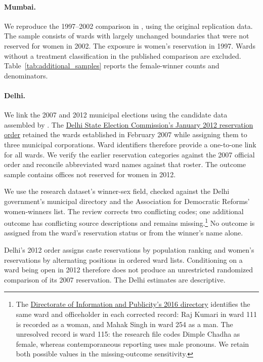 \paragraph{Mumbai.} We reproduce the 1997--2002 comparison in \citet{bhavnani2009electoral}, using the original replication data. The sample consists of \appMumbaiN{} wards with largely unchanged boundaries that were not reserved for women in 2002. The exposure is women's reservation in 1997. Wards without a treatment classification in the published comparison are excluded. Table~\ref{tab:additional_samples} reports the female-winner counts and denominators.

\paragraph{Delhi.} We link the 2007 and 2012 municipal elections using the candidate data assembled by \citet{goyal2025local}. The \href{https://sec.delhi.gov.in/sites/default/files/SEC/circulars-orders/notification-regarding-reservation-seats-2012_1.pdf}{Delhi State Election Commission's January 2012 reservation order} retained the wards established in February 2007 while assigning them to three municipal corporations. Ward identifiers therefore provide a one-to-one link for all \appDelhiLinked{} wards. We verify the earlier reservation categories against the 2007 official order and reconcile abbreviated ward names against that roster. The outcome sample contains \appDelhiOpen{} offices not reserved for women in 2012.

We use the research dataset's winner-sex field, checked against the Delhi government's municipal directory and the Association for Democratic Reforms' women-winners list. The review corrects two conflicting codes; one additional outcome has conflicting source descriptions and remains missing.\footnote{The \href{https://delhishelterboard.in/main/wp-content/uploads/2019/06/Online-Directory-2016-Delhi-Govt.pdf}{Directorate of Information and Publicity's 2016 directory} identifies the same ward and officeholder in each corrected record: Raj Kumari in ward 111 is recorded as a woman, and Mahak Singh in ward 254 as a man. The unresolved record is ward 115: the research file codes Dimple Chadha as female, whereas contemporaneous reporting uses male pronouns. We retain both possible values in the missing-outcome sensitivity.} No outcome is assigned from the ward's reservation status or from the winner's name alone.

Delhi's 2012 order assigns caste reservations by population ranking and women's reservations by alternating positions in ordered ward lists. Conditioning on a ward being open in 2012 therefore does not produce an unrestricted randomized comparison of its 2007 reservation. The Delhi estimates are descriptive.

